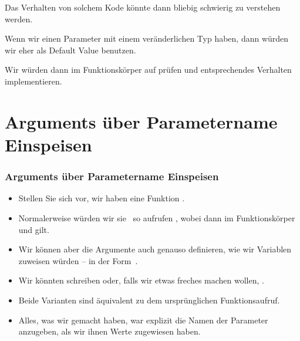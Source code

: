 \documentclass[aspectratio=169,mathserif,notheorems]{beamer}%
\begin{document}
\begin{frame}
\begin{itemize}
{%
\item<13-> Das Verhalten von solchem Kode könnte dann bliebig schwierig zu verstehen werden.%
%
\item<14-> Wenn wir einen Parameter mit einem veränderlichen Typ haben, dann würden wir eher  als Default Value benutzen.%
%
\item<15-> Wir würden dann im Funktionskörper auf  prüfen und entsprechendes Verhalten implementieren.%
}%
\end{itemize}%
%
%
%
\end{frame}%
%
\section{Arguments über Parametername Einspeisen}%
%
\begin{frame}%
\frametitle{Arguments über Parametername Einspeisen}%
\begin{itemize}%
\item Stellen Sie sich vor, wir haben eine Funktion .%
%
\item<2-> Normalerweise würden wir sie \DEzB\ so aufrufen , wobei dann im Funktionskörper   und  gilt.%
%
\item<3-> Wir können aber die Argumente auch genauso definieren, wie wir Variablen zuweisen würden -- in der Form~.%
%
\item<4-> Wir könnten schreiben  oder, falls wir etwas freches machen wollen, .%
%
\item<5-> Beide Varianten sind äquivalent zu dem ursprünglichen Funktionsaufruf.%
%
\item<6-> Alles, was wir gemacht haben, war explizit die Namen der Parameter anzugeben, als wir ihnen Werte zugewiesen haben.%
\end{itemize}%
\end{frame}
%
\end{document}
